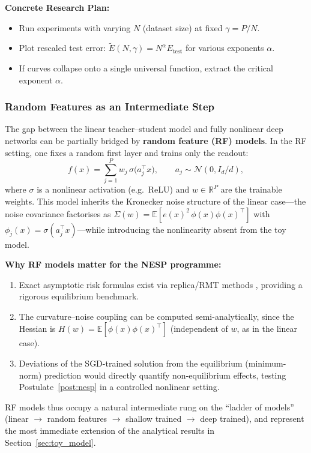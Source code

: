 \documentclass[
  journal=largetwo,
  simfonts=false,
  year=2025,
  volume=37,
]{cup-journal}
\begin{document}
\textbf{Concrete Research Plan:}
\begin{itemize}
    \item Run experiments with varying $N$ (dataset size) at fixed $\gamma = P/N$.
    \item Plot rescaled test error: $\tilde{E}(N, \gamma) = N^{\alpha} E_{\text{test}}$ for various exponents $\alpha$.
    \item If curves collapse onto a single universal function, extract the critical exponent $\alpha$.
\end{itemize}

\subsubsection{Random Features as an Intermediate Step}

The gap between the linear teacher--student model and fully nonlinear deep networks can be partially bridged by \textbf{random feature (RF) models}. In the RF setting, one fixes a random first layer and trains only the readout:
\begin{equation}
    f(x) = \sum_{j=1}^{P} w_j \,\sigma\!\bigl(a_j^\top x\bigr), \qquad a_j \sim \mathcal{N}(0, I_d/d),
\end{equation}
where $\sigma$ is a nonlinear activation (e.g.\ ReLU) and $w \in \mathbb{R}^P$ are the trainable weights. This model inherits the Kronecker noise structure of the linear case---the noise covariance factorises as $\Sigma(w) = \mathbb{E}[e(x)^2\,\phi(x)\phi(x)^\top]$ with $\phi_j(x) = \sigma(a_j^\top x)$---while introducing the nonlinearity absent from the toy model.

\textbf{Why RF models matter for the NESP programme:}
\begin{enumerate}
    \item Exact asymptotic risk formulas exist via replica/RMT methods \cite{mei2020generalizationerrorrandomfeatures}, providing a rigorous equilibrium benchmark.
    \item The curvature--noise coupling can be computed semi-analytically, since the Hessian is $H(w) = \mathbb{E}[\phi(x)\phi(x)^\top]$ (independent of $w$, as in the linear case).
    \item Deviations of the SGD-trained solution from the equilibrium (minimum-norm) prediction would directly quantify non-equilibrium effects, testing Postulate~\ref{post:nesp} in a controlled nonlinear setting.
\end{enumerate}
RF models thus occupy a natural intermediate rung on the ``ladder of models'' (linear $\to$ random features $\to$ shallow trained $\to$ deep trained), and represent the most immediate extension of the analytical results in Section~\ref{sec:toy_model}.
\end{document}

